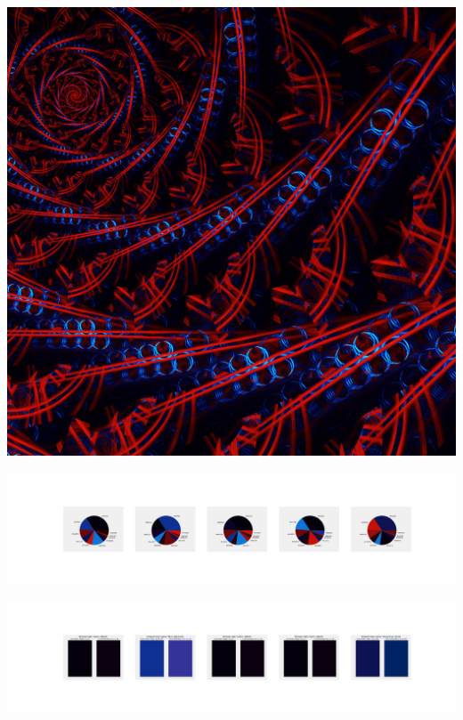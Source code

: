 \documentclass[11pt]{article}
\begin{document}
\begin{landscape}
    \begin{center}
    \includegraphics[width=\textwidth]{./nbimg/file (130).jpg}
    \end{center}

    \begin{center}
    \includegraphics[width=250mm]{./nbimg/pie-35.jpg}
    \end{center}

    \begin{center}
    \includegraphics[width=250mm]{./nbimg/peak-35.jpg}
    \end{center}
    


\end{landscape}
\end{document}
